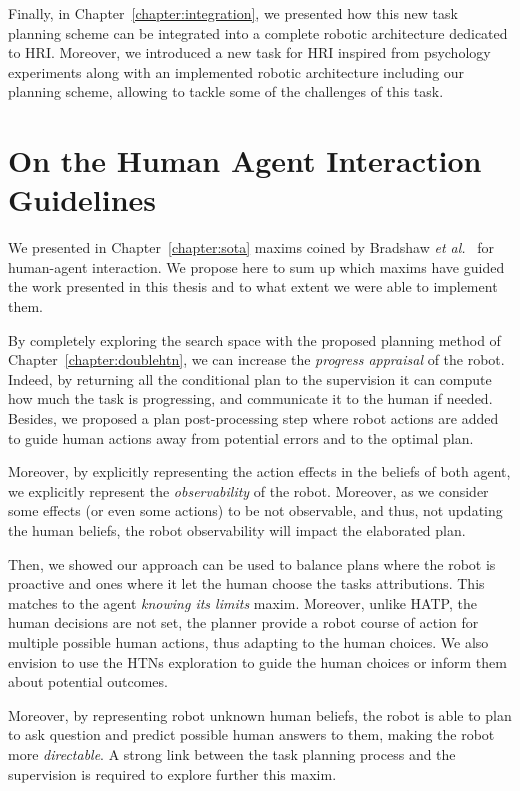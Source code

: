 \documentclass[a4paper,11pt,twoside]{StyleThese}
\begin{document}
Finally, in Chapter~\ref{chapter:integration}, we presented how this new task planning scheme can be integrated into a complete robotic architecture dedicated to HRI. Moreover, we introduced a new task for HRI inspired from psychology experiments along with an implemented robotic architecture including our planning scheme, allowing to tackle some of the challenges of this task.

\section*{On the Human Agent Interaction Guidelines}
We presented in Chapter~\ref{chapter:sota} maxims coined by Bradshaw \textit{et al.}~\cite{bradshaw2011human} for human-agent interaction. We propose here to sum up which maxims have guided the work presented in this thesis and to what extent we were able to implement them.

By completely exploring the search space with the proposed planning method of Chapter~\ref{chapter:doublehtn}, we can increase the \textit{progress appraisal} of the robot. Indeed, by returning all the conditional plan to the supervision it can compute how much the task is progressing, and communicate it to the human if needed. Besides, we proposed a plan post-processing step where robot actions are added to guide human actions away from potential errors and to the optimal plan.

Moreover, by explicitly representing the action effects in the beliefs of both agent, we explicitly represent the \textit{observability} of the robot. Moreover, as we consider some effects (or even some actions) to be not observable, and thus, not updating the human beliefs, the robot observability will impact the elaborated plan.

Then, we showed our approach can be used to balance plans where the robot is proactive and ones where it let the human choose the tasks attributions. This matches to the agent \textit{knowing its limits} maxim. Moreover, unlike HATP, the human decisions are not set, the planner provide a robot course of action for multiple possible human actions, thus adapting to the human choices. We also envision to use the HTNs exploration to guide the human choices or inform them about potential outcomes.

Moreover, by representing robot unknown human beliefs, the robot is able to plan to ask question and predict possible human answers to them, making the robot more \textit{directable}. A strong link between the task planning process and the supervision is required to explore further this maxim.
\end{document}
